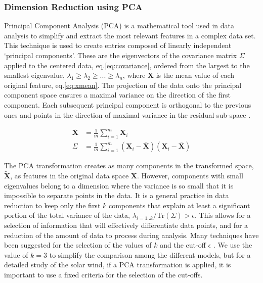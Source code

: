 \subsubsection{Dimension Reduction using PCA}
\label{sec:reducpca}
Principal Component Analysis (PCA) is a mathematical tool used in data analysis to simplify and extract the most relevant features in a complex data set. This technique is used to create entries composed of linearly independent `principal components'. These are the eigenvectors of the covariance matrix $\Sigma$ applied to the centered data, eq.\eqref{eq:covariance}, ordered from the largest to the smallest eigenvalue, $\lambda_1 \ge \lambda_2 \ge ... \ge \lambda_n$, where $\overline{\boldsymbol{X}}$ is the mean value of each original feature, eq.\eqref{eq:xmean}. The projection of the data onto the principal component space ensures a maximal variance on the direction of the first component. Each subsequent principal component is orthogonal to the previous ones and points in the direction of maximal variance in the residual sub-space \citep{Shlens2014}.

\begin{align}
\overline{\boldsymbol{X}} & = \frac{1}{m} \sum_{i=1}^{m} \boldsymbol{X}_i \label{eq:xmean} \\
\Sigma & = \frac{1}{m} \sum_{i=1}^{m} \left( \boldsymbol{X}_i - \overline{\boldsymbol{X}} \right)\left( \boldsymbol{X}_i - \overline{\boldsymbol{X}} \right) \label{eq:covariance}
\end{align}

The PCA transformation creates as many components in the transformed space, $\boldsymbol{\tilde{X}}$, as features in the original data space $\boldsymbol{X}$. However, components with small eigenvalues belong to a dimension where the variance is so small that it is impossible to separate points in the data. It is a general practice in data reduction to keep only the first $k$ components that explain at least a significant portion of the total variance of the data, $\lambda_{i=1..k}/\text{Tr}(\Sigma) > \epsilon$. This allows for a selection of information that will effectively differentiate data points, and for a reduction of the amount of data to process during analysis. Many techniques have been suggested for the selection of the values of $k$ and the cut-off $\epsilon$ \citep{Rea2016}. We use the value of $k=3$ to simplify the comparison among the different models, but for a detailed study of the solar wind, if a PCA transformation is applied, it is important to use a fixed criteria for the selection of the cut-offs.

